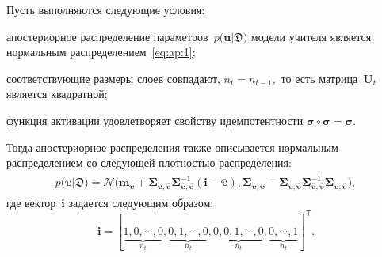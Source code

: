 \documentclass[12pt]{a&t}
\begin{document}
\begin{theorem}
\label{theorem:ap:layer}
Пусть выполняются следующие условия:
\begin{enumlist}
\item апостериорное распределение параметров~$p\bigr(\mathbf{u}|\mathfrak{D}\bigr)$ модели учителя является нормальным распределением~\eqref{eq:ap:1};
\item соответствующие размеры слоев совпадают, $n_t=n_{t-1},$ то есть матрица~$\mathbf{U}_t$ является квадратной;
\item функция активации удовлетворяет свойству идемпотентности $\bm{\sigma} \circ \bm{\sigma} = \bm{\sigma}$.
\end{enumlist}
Тогда апостериорное распределения также описывается нормальным распределением со следующей плотностью распределения:
\begin{gather}
\label{eq:ap:5}
\begin{aligned}
p\bigr(\bm{\upsilon}|\mathfrak{D}\bigr) = \mathcal{N}\bigr(\mathbf{m}_{\bm{\upsilon}}+\bm{\Sigma}_{\bm{\upsilon},\bar{\bm{\upsilon}}} \bm{\Sigma}_{\bar{\bm{\upsilon}},\bar{\bm{\upsilon}}}^{-1} \left(\mathbf{i} - \bar{\bm{\upsilon}}\right), \bm{\Sigma}_{\bm{\upsilon},\bm{\upsilon}} - \bm{\Sigma}_{\bm{\upsilon},\bar{\bm{\upsilon}}}\bm{\Sigma}_{\bar{\bm{\upsilon}},\bar{\bm{\upsilon}}}^{-1}\bm{\Sigma}_{\bm{\upsilon},\bar{\bm{\upsilon}}}\bigr),
\end{aligned}
\end{gather}
где вектор~$\mathbf{i}$ задается следующим образом:
\[
\mathbf{i}=[\underbrace{1, 0, \cdots, 0}_{n_t}, \underbrace{0, 1, \cdots, 0}_{n_t}, \underbrace{0, 0, 1, \cdots, 0}_{n_t}, \underbrace{0, \cdots, 1}_{n_t}]^{\mathsf{T}}.
\]
\end{theorem}
\end{document}
